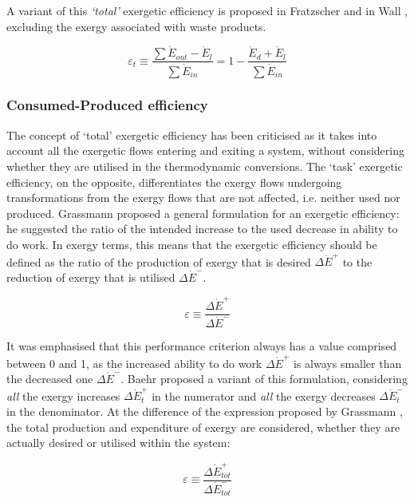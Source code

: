 \documentclass[times,3p]{elsarticle}
\begin{document}
A variant of this \emph{`total'} exergetic efficiency is proposed in Fratzscher \cite{Fratzscher1986} and in Wall \cite{Wall2004}, excluding the exergy associated with waste products. 

\begin{equation}
	\varepsilon_t \equiv \frac{\sum \dot{E}_{out}-\dot{E}_l}{\sum \dot{E}_{in}} = 1-\frac{\dot{E}_d+\dot{E}_l}{\sum \dot{E}_{in}}
\end{equation} 
 
\subsubsection{Consumed-Produced efficiency}

The concept of `total' exergetic efficiency has been criticised as it takes into account all the exergetic flows entering and exiting a system, without considering whether they are utilised in the thermodynamic conversions. The `task' exergetic efficiency, on the opposite, differentiates the exergy flows undergoing transformations from the exergy flows that are not affected, i.e. neither used nor produced. Grassmann \cite{Grassmann1950} proposed a general formulation for an exergetic efficiency: he suggested the ratio of the intended increase to the used decrease in ability to do work. In exergy terms, this means that the exergetic efficiency should be defined as the ratio of the production of exergy that is desired $\Delta \dot{E}^+$ to the reduction of exergy that is utilised $\Delta \dot{E}^-$.

\begin{equation}
	\varepsilon \equiv \frac{\Delta \dot{E}^+}{\Delta \dot{E}^-}
\end{equation}

It was emphasised that this performance criterion always has a value comprised between 0 and 1, as the increased ability to do work $\Delta \dot{E}^+$ is always smaller than the decreased one $\Delta \dot{E}^-$. Baehr \cite{Baehr1968} proposed a variant of this formulation, considering \emph{all} the exergy increases $\Delta \dot{E}^+_t$ in the numerator and \emph{all} the exergy decreases $\Delta \dot{E}^-_t$ in the denominator. At the difference of the expression proposed by Grassmann \cite{Grassmann1950}, the total production and expenditure of exergy are considered, whether they are actually desired or utilised within the system:

\begin{equation}
	\varepsilon \equiv \frac{\Delta \dot{E}^+_{tot}}{\Delta \dot{E}^-_{tot}}
\end{equation}
\end{document}
